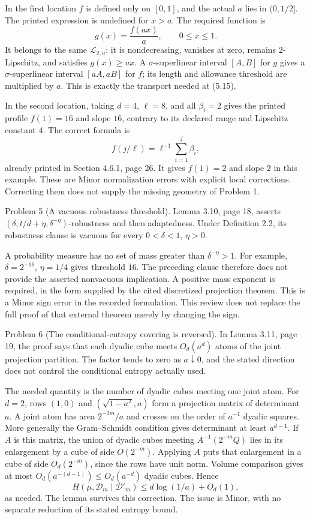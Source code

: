 \documentclass[10pt]{article}
\begin{document}
In the first location \(f\) is defined only on \([0,1]\), and the actual \(a\) lies in \((0,1/2]\). The printed expression is undefined for \(x>a\). The required function is \[g(x)=\frac{f(ax)}a,\qquad 0\le x\le1.\] It belongs to the same \(\mathcal L_{2,u}\): it is nondecreasing, vanishes at zero, remains \(2\)-Lipschitz, and satisfies \(g(x)\ge ux\). A \(\sigma\)-superlinear interval \([A,B]\) for \(g\) gives a \(\sigma\)-superlinear interval \([aA,aB]\) for \(f\); its length and allowance threshold are multiplied by \(a\). This is exactly the transport needed at (5.15).\par
In the second location, taking \(d=4\), \(\ell=8\), and all \(\beta_i=2\) gives the printed profile \(f(1)=16\) and slope \(16\), contrary to its declared range and Lipschitz constant \(4\). The correct formula is \[f(j/\ell)=\ell^{-1}\sum_{i=1}^j\beta_i,\] already printed in Section 4.6.1, page 26. It gives \(f(1)=2\) and slope \(2\) in this example. These are Minor normalization errors with explicit local corrections. Correcting them does not supply the missing geometry of Problem 1.\par
Problem 5 (A vacuous robustness threshold).  Lemma 3.10, page 18, asserts \((\delta,t/d+\eta,\delta^{-\eta})\)-robustness and then adaptedness. Under Definition 2.2, its robustness clause is vacuous for every \(0<\delta<1\), \(\eta>0\).\par
A probability measure has no set of mass greater than \(\delta^{-\eta}>1\). For example, \(\delta=2^{-16}\), \(\eta=1/4\) gives threshold \(16\). The preceding clause therefore does not provide the asserted nonvacuous implication. A positive mass exponent is required, in the form supplied by the cited discretized projection theorem. This is a Minor sign error in the recorded formulation. This review does not replace the full proof of that external theorem merely by changing the sign.\par
Problem 6 (The conditional-entropy covering is reversed).  In Lemma 3.11, page 19, the proof says that each dyadic cube meets \(O_d(a^d)\) atoms of the joint projection partition. The factor tends to zero as \(a\downarrow0\), and the stated direction does not control the conditional entropy actually used.\par
The needed quantity is the number of dyadic cubes meeting one joint atom. For \(d=2\), rows \((1,0)\) and \((\sqrt{1-a^2},a)\) form a projection matrix of determinant \(a\). A joint atom has area \(2^{-2m}/a\) and crosses on the order of \(a^{-1}\) dyadic squares. More generally the Gram–Schmidt condition gives determinant at least \(a^{d-1}\). If \(A\) is this matrix, the union of dyadic cubes meeting \(A^{-1}(2^{-m}Q)\) lies in its enlargement by a cube of side \(O(2^{-m})\). Applying \(A\) puts that enlargement in a cube of side \(O_d(2^{-m})\), since the rows have unit norm. Volume comparison gives at most \(O_d(a^{-(d-1)})\le O_d(a^{-d})\) dyadic cubes. Hence \[H(\mu,\mathcal D_m\mid\mathcal D'_m)
 \le d\log(1/a)+O_d(1),\] as needed. The lemma survives this correction. The issue is Minor, with no separate reduction of its stated entropy bound.\par
\end{document}
